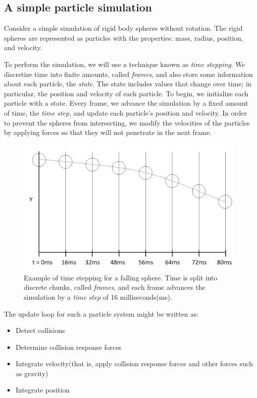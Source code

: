 \documentclass[]{article}
\begin{document}
	\subsection{A simple particle simulation}
	Consider a simple simulation of rigid body spheres without rotation. The rigid spheres are represented as particles
	with the properties: mass, radius, position, and velocity. 
	
	To perform the simulation, we will use a technique known as \textit{time stepping}. We discretize time into finite 
	amounts, called \textit{frames}, and also store some information about each particle, the \textit{state}. The state
	includes values that change over time; in particular, the position and velocity of each particle. To begin, we initialize
	each particle with a state. Every frame, we advance the simulation by a fixed amount of time, the \textit{time step}, 
	and update each particle's position and velocity. In order to prevent the spheres from intersecting, we modify the
	velocities of the particles by applying forces so that they will not penetrate in the next frame.\\
	
	\begin{figure}[ht]
	  \centering
	  \includegraphics[width=6.0in]{images/TimeStepping}
	  \caption{Example of time stepping for a falling sphere. Time is split into discrete chunks, called \textit{frames},
	  and each frame advances the simulation by a \textit{time step} of 16 milliseconds(ms).}
	\end{figure}
	
	The update loop for such a particle system might be written as:
	\begin{itemize}
		\item Detect collisions
		\item Determine collision response forces
		\item Integrate velocity(that is, apply collision response forces and other forces such as gravity)
		\item Integrate position
	\end{itemize}
	
\end{document}
